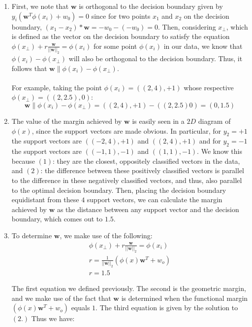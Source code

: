 \documentclass[submit]{harvardml}
\begin{document}
\begin{enumerate}
	\item First, we note that $\mathbf{w}$ is orthogonal to the decision boundary given by $y_i(\mathbf{w}^T \phi(x_i) +
	w_0)=0$ since for two points $x_1$ and $x_2$ on the decision boundary, $(x_1-x_2)*\mathbf{w} = -w_0-(-w_0) = 0$. Then, considering $x_\perp$, which is defined as the vector on the decision boundary to satisfy the equation $\phi(x_\perp)+r\frac{\mathbf{w}}{||\mathbf{w}||_2}=\phi(x_i)$ for some point $\phi(x_i)$ in our data, we know that $\phi(x_i)-\phi(x_\perp)$ will also be orthogonal to the decision boundary. Thus, it follows that $\mathbf{w} \parallel \phi(x_i)-\phi(x_\perp)$. \\\\
	For example, taking the point $\phi(x_i) = ((2,4),+1)$ whose respective $\phi(x_\perp) = ((2,2.5),0)$:
	\[
	\mathbf{w} \parallel \phi(x_i)-\phi(x_\perp) = ((2,4),+1)-((2,2.5)0) = (0,1.5)
	\]
	
	\item The value of the margin achieved by $\mathbf{w}$ is easily seen in a $2D$ diagram of $\phi(x)$, since the support vectors are made obvious. In particular, for $y_2=+1$ the support vectors are $((-2,4),+1)$ and $((2,4),+1)$ and for $y_2=-1$ the support vectors are $((-1,1),-1)$ and $((1,1),-1)$. We know this because $(1)$: they are the closest, oppositely classified vectors in the data, and $(2)$: the difference between these positively classified vectors is parallel to the difference in these negatively classified vectors, and thus, also parallel to the optimal decision boundary. Then, placing the decision boundary equidistant from these $4$ support vectors, we can calculate the margin achieved by $\mathbf{w}$ as the distance between any support vector and the decision boundary, which comes out to $1.5$.
	
	\item To determine $\mathbf{w}$, we make use of the following:
	\begin{align*}
	& \phi(x_\perp)+r\frac{\mathbf{w}}{||\mathbf{w}||_2}=\phi(x_i) \\
	& r = \frac{1}{||\mathbf{w}||_2}(\phi(x)\mathbf{w}^T+w_o) \\
	& r=1.5 &
	\end{align*}
	
	The first equation we defined previously. The second is the geometric margin, and we make use of the fact that $\mathbf{w}$ is determined when the functional margin $(\phi(x)\mathbf{w}^T+w_o) $ equals $1$. The third equation is given by the solution to $(2.)$ Thus we have:
	

\end{enumerate}
\end{document}
